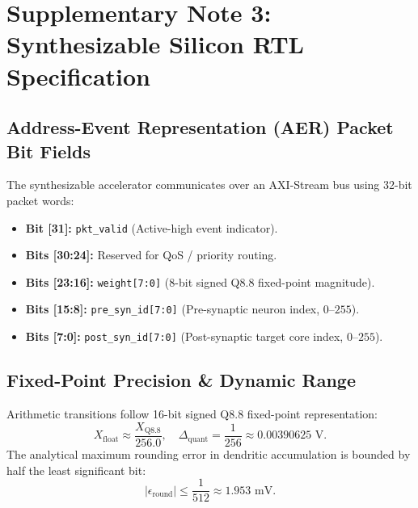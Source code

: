 \documentclass[10pt,letterpaper]{article}
\begin{document}
\newpage

\section{Supplementary Note 3: Synthesizable Silicon RTL Specification}

\subsection{Address-Event Representation (AER) Packet Bit Fields}
The synthesizable accelerator communicates over an AXI-Stream bus using 32-bit packet words:
\begin{itemize}[leftmargin=*]
    \item \textbf{Bit [31]:} \texttt{pkt\_valid} (Active-high event indicator).
    \item \textbf{Bits [30:24]:} Reserved for QoS / priority routing.
    \item \textbf{Bits [23:16]:} \texttt{weight[7:0]} (8-bit signed Q8.8 fixed-point magnitude).
    \item \textbf{Bits [15:8]:} \texttt{pre\_syn\_id[7:0]} (Pre-synaptic neuron index, $0\text{--}255$).
    \item \textbf{Bits [7:0]:} \texttt{post\_syn\_id[7:0]} (Post-synaptic target core index, $0\text{--}255$).
\end{itemize}

\subsection{Fixed-Point Precision \& Dynamic Range}
Arithmetic transitions follow 16-bit signed Q8.8 fixed-point representation:
\begin{equation}
X_{\mathrm{float}} \approx \frac{X_{\mathrm{Q8.8}}}{256.0}, \quad \Delta_{\mathrm{quant}} = \frac{1}{256} \approx 0.00390625\text{ V}.
\end{equation}
The analytical maximum rounding error in dendritic accumulation is bounded by half the least significant bit:
\begin{equation}
|\epsilon_{\mathrm{round}}| \le \frac{1}{512} \approx 1.953\text{ mV}.
\end{equation}
\end{document}

